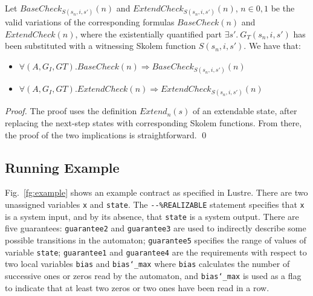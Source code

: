 \begin{theorem} Let $\mathit{BaseCheck}_{S(s_n,i,s')}(n)$ and
$\mathit{ExtendCheck}_{S(s_n,i,s')}(n)$, $n \in {0,1}$ be the valid
variations of the corresponding formulas $\mathit{BaseCheck(n)}$ and
$\mathit{ExtendCheck(n)}$, where the existentially quantified part $\exists s'.~
G_T(s_n, i, s')$ has been substituted with a witnessing Skolem function 
$S(s_n,i,s')$.  We have that:
\begin{itemize}
\item $\forall (A,G_{I},G{T}). \mathit{BaseCheck}(n) \Rightarrow \mathit{BaseCheck}_{S(s_n,i,s')}(n)$
\item $\forall (A,G_{I},G{T}). \mathit{ExtendCheck}(n) \Rightarrow
ExtendCheck_{S(s_n,i,s')}(n)$
\end{itemize}
\end{theorem}
\begin{proof}
The proof uses the definition $\mathit{Extend}_n(s)$ of an extendable state,
after replacing the next-step states with corresponding Skolem functions. From there,
the proof of the two implications is straightforward.
\qed
\end{proof}


\subsection{Running Example} 
\label{sec:example}

Fig.~\ref{fg:example} shows an example contract as specified in
Lustre. There are two unassigned variables \texttt{x} and
\texttt{state}. The \texttt{{-}{-}\%REALIZABLE} statement specifies
that \texttt{x} is a system input, and by its absence, that
\texttt{state} is a system output. There are five guarantees:
\texttt{guarantee2} and \texttt{guarantee3} are used to indirectly
describe some possible transitions in the automaton;
\texttt{guarantee5} specifies the range of
values of variable \texttt{state};
\texttt{guarantee1} and \texttt{guarantee4} are the requirements with respect to
two local variables \texttt{bias} and \texttt{bias\char`_max} where
 \texttt{bias} calculates the number of successive ones or
zeros read by the automaton, and \texttt{bias\char`_max} is used as
a flag to indicate that at least two zeros or two ones have been read
in a row.

